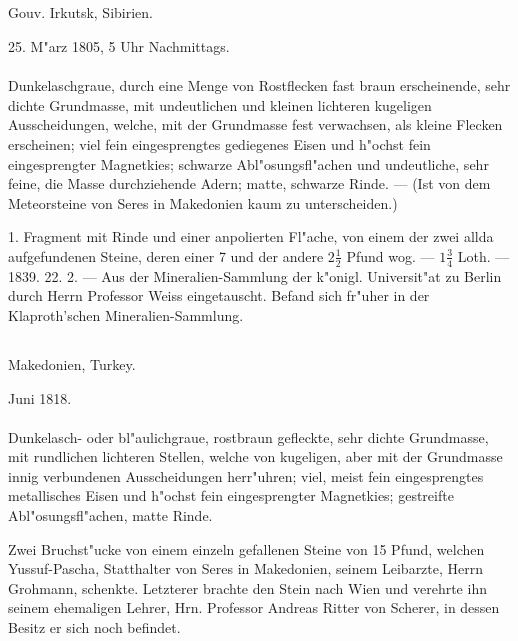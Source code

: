\documentclass[a4paper, 11pt, oneside, polutonikogreek, german]{article}
\begin{document}
\subsection{}
\begin{center}

Gouv. Irkutsk, Sibirien.

25. M"arz 1805, 5 Uhr Nachmittags.
\end{center}
\paragraph{}
Dunkelaschgraue, durch eine Menge von Rostflecken fast braun erscheinende, sehr dichte Grundmasse, mit undeutlichen und kleinen lichteren kugeligen Ausscheidungen, welche, mit der Grundmasse fest verwachsen, als kleine Flecken erscheinen; viel fein eingesprengtes gediegenes Eisen und h"ochst fein eingesprengter Magnetkies; schwarze Abl"osungsfl"achen und undeutliche, sehr feine, die Masse durchziehende Adern; matte, schwarze Rinde. --- (Ist von dem Meteorsteine von Seres in Makedonien kaum zu unterscheiden.)

1. Fragment mit Rinde und einer anpolierten Fl"ache, von einem der zwei allda aufgefundenen Steine, deren einer 7 und der andere $\mathfrak{2\frac{1}{2}}$ Pfund wog. --- $\mathfrak{1\frac{3}{4}}$ Loth. --- 1839. 22. 2. --- Aus der Mineralien-Sammlung der k"onigl. Universit"at zu Berlin durch Herrn Professor Weiss eingetauscht. Befand sich fr"uher in der Klaproth'schen Mineralien-Sammlung.
\subsection{}
\begin{center}

Makedonien, Turkey.

Juni 1818.
\end{center}
\paragraph{}
Dunkelasch- oder bl"aulichgraue, rostbraun gefleckte, sehr dichte Grundmasse, mit rundlichen lichteren Stellen, welche von kugeligen, aber mit der Grundmasse innig verbundenen Ausscheidungen herr"uhren; viel, meist fein eingesprengtes metallisches Eisen und h"ochst fein eingesprengter Magnetkies; gestreifte Abl"osungsfl"achen, matte Rinde.

Zwei Bruchst"ucke von einem einzeln gefallenen Steine von 15 Pfund, welchen Yussuf-Pascha, Statthalter von Seres in Makedonien, seinem Leibarzte, Herrn Grohmann, schenkte. Letzterer brachte den Stein nach Wien und verehrte ihn seinem ehemaligen Lehrer, Hrn. Professor Andreas Ritter von Scherer, in dessen Besitz er sich noch befindet.
\end{document}
